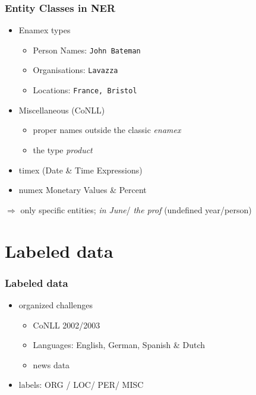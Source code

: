 \documentclass[10pt]{beamer}
\begin{document}


\begin{frame}
\frametitle{Entity Classes in NER}

\begin{itemize}
 \item Enamex types
\begin{itemize}
 \item Person Names: \texttt{John Bateman}
 \item Organisations: \texttt{Lavazza}
 \item Locations: \texttt{France, Bristol}
\end{itemize}

 \item Miscellaneous (CoNLL)
 \begin{itemize}
  \item  proper names outside the classic \emph{enamex}
  \item the type \emph{product}
 \end{itemize}

 \item timex (Date \& Time Expressions)
 
\item numex Monetary Values \& Percent
\end{itemize}        

$\Rightarrow$ only specific entities; \emph{in June}/ \emph{the prof} (undefined year/person) %
 \end{frame}


\section{Labeled data}
\begin{frame}
\frametitle{Labeled data}


\begin{itemize}
        \item organized challenges
        \begin{itemize}
         \item CoNLL 2002/2003 
         \item Languages: English, German, Spanish \& Dutch
         \item news data 
        \end{itemize}
    \item labels: ORG / LOC/  PER/ MISC 
\end{itemize}
\end{frame}
\end{document}

